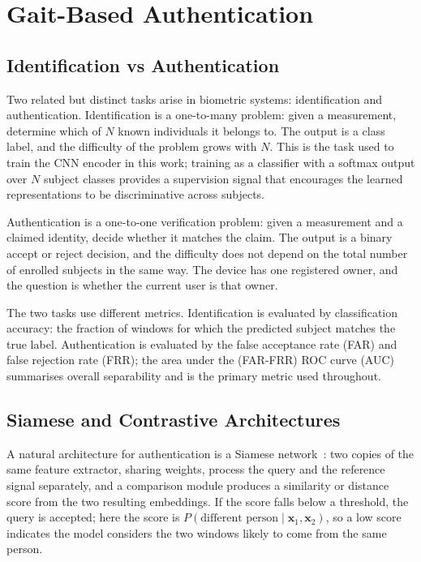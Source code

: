 \section{Gait-Based Authentication}
\label{sec:bg_auth}

\subsection{Identification vs Authentication}
\label{ssec:bg_id_vs_auth}

Two related but distinct tasks arise in biometric systems: identification and authentication. Identification is a one-to-many problem: given a measurement, determine which of $N$ known individuals it belongs to. The output is a class label, and the difficulty of the problem grows with $N$. This is the task used to train the CNN encoder in this work; training as a classifier with a softmax output over $N$ subject classes provides a supervision signal that encourages the learned representations to be discriminative across subjects.

Authentication is a one-to-one verification problem: given a measurement and a claimed identity, decide whether it matches the claim. The output is a binary accept or reject decision, and the difficulty does not depend on the total number of enrolled subjects in the same way. The device has one registered owner, and the question is whether the current user is that owner.

The two tasks use different metrics. Identification is evaluated by classification accuracy: the fraction of windows for which the predicted subject matches the true label. Authentication is evaluated by the false acceptance rate (FAR) and false rejection rate (FRR); the area under the (FAR-FRR) ROC curve (AUC) summarises overall separability and is the primary metric used throughout.

\subsection{Siamese and Contrastive Architectures}
\label{ssec:bg_siamese}

A natural architecture for authentication is a Siamese network~\cite{bromley1994signature}: two copies of the same feature extractor, sharing weights, process the query and the reference signal separately, and a comparison module produces a similarity or distance score from the two resulting embeddings. If the score falls below a threshold, the query is accepted; here the score is $P(\text{different person} \mid \mathbf{x}_1, \mathbf{x}_2)$, so a low score indicates the model considers the two windows likely to come from the same person.

